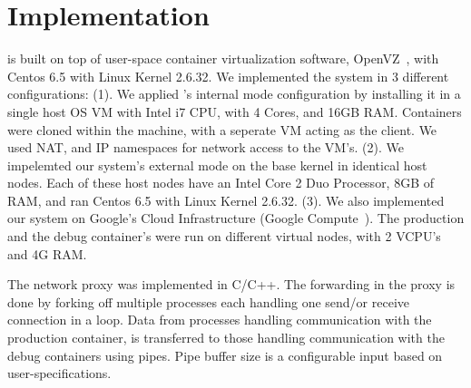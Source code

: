 
\section{Implementation}
\label{sec:implementation}

\parikshan is built on top of user-space container virtualization software, OpenVZ~\cite{openvz}, with Centos 6.5 with Linux Kernel 2.6.32.
We implemented the system in 3 different configurations: 
(1). We applied \parikshan 's internal mode configuration by installing it in a single host OS VM with Intel i7 CPU, with 4 Cores, and 16GB RAM. 
Containers were cloned within the machine, with a seperate VM acting as the client.
We used NAT, and IP namespaces for network access to the VM's.
(2). We impelemted our system's external mode on the base kernel in identical host nodes. 
Each of these host nodes have an Intel Core 2 Duo Processor, 8GB of RAM, and ran Centos 6.5 with Linux Kernel 2.6.32.
(3). We also implemented our system on Google's Cloud Infrastructure (Google Compute~\cite{gcompute}).
The production and the debug container's were run on different virtual nodes, with 2 VCPU's and 4G RAM. 

The network proxy was implemented in C/C++.
The forwarding in the proxy is done by forking off multiple processes each handling one send/or receive connection in a loop.
Data from processes handling communication with the production container, is  transferred to those handling communication with the debug containers using pipes.
Pipe buffer size is a configurable input based on user-specifications. 